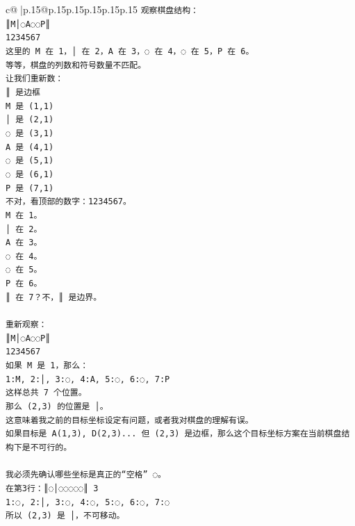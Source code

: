 \documentclass{article}
\begin{document}
{\begin{supertabular}{c@{$\;$}|p{.15\linewidth}@{}p{.15\linewidth}p{.15\linewidth}p{.15\linewidth}p{.15\linewidth}p{.15\linewidth}}
{{{\texttt{观察棋盘结构：} \\
\texttt{║M│◌A◌◌P║} \\
\texttt{1234567} \\
\texttt{这里的 M 在 1，│ 在 2，A 在 3，◌ 在 4，◌ 在 5，P 在 6。} \\
\texttt{等等，棋盘的列数和符号数量不匹配。} \\
\texttt{让我们重新数：} \\
\texttt{║ 是边框} \\
\texttt{M 是 (1,1)} \\
\texttt{│ 是 (2,1)} \\
\texttt{◌ 是 (3,1)} \\
\texttt{A 是 (4,1)} \\
\texttt{◌ 是 (5,1)} \\
\texttt{◌ 是 (6,1)} \\
\texttt{P 是 (7,1)} \\
\texttt{不对，看顶部的数字：1234567。} \\
\texttt{M 在 1。} \\
\texttt{│ 在 2。} \\
\texttt{A 在 3。} \\
\texttt{◌ 在 4。} \\
\texttt{◌ 在 5。} \\
\texttt{P 在 6。} \\
\texttt{║ 在 7？不，║ 是边界。} \\
\\ 
\texttt{重新观察：} \\
\texttt{║M│◌A◌◌P║} \\
\texttt{1234567} \\
\texttt{如果 M 是 1，那么：} \\
\texttt{1:M, 2:│, 3:◌, 4:A, 5:◌, 6:◌, 7:P} \\
\texttt{这样总共 7 个位置。} \\
\texttt{那么 (2,3) 的位置是 │。} \\
\texttt{这意味着我之前的目标坐标设定有问题，或者我对棋盘的理解有误。} \\
\texttt{如果目标是 A(1,3), D(2,3)... 但 (2,3) 是边框，那么这个目标坐标方案在当前棋盘结构下是不可行的。} \\
\\ 
\texttt{我必须先确认哪些坐标是真正的“空格” ◌。} \\
\texttt{在第3行：║◌│◌◌◌◌◌║ 3} \\
\texttt{1:◌, 2:│, 3:◌, 4:◌, 5:◌, 6:◌, 7:◌} \\
\texttt{所以 (2,3) 是 │，不可移动。} \\
}}}
\end{supertabular}}
\end{document}
